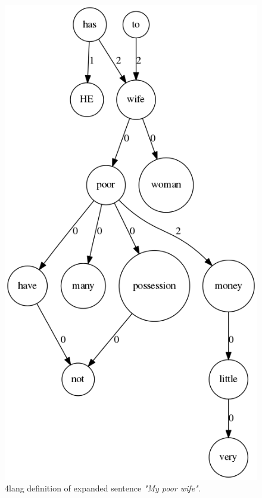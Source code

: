 \begin{figure}
	\centering
	\includegraphics[scale=0.5]{figures/mypoorexpanded}
	\caption{4lang definition of expanded sentence \textit{"My poor wife"}.}
	\label{fig:mypoorexpanded}
\end{figure}


